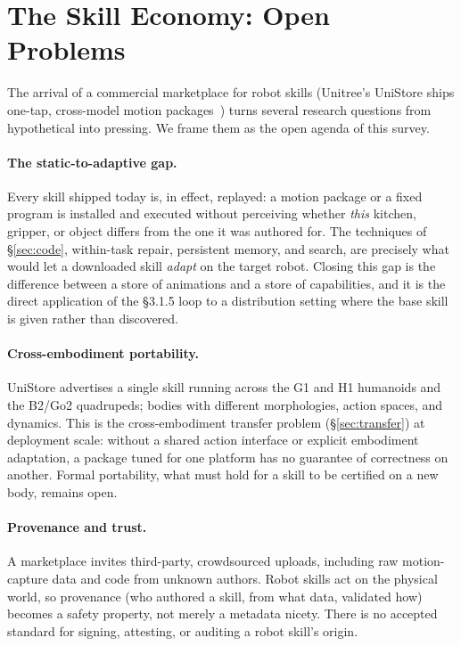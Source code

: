\section{The Skill Economy: Open Problems}
\label{sec:open}

The arrival of a commercial marketplace for robot skills (Unitree's UniStore ships
one-tap, cross-model motion packages~\citep{unistore2026}) turns several research
questions from hypothetical into pressing. We frame them as the open agenda of this survey.

\paragraph{The static-to-adaptive gap.}
Every skill shipped today is, in effect, replayed: a motion package or a fixed program is
installed and executed without perceiving whether \emph{this} kitchen, gripper, or object
differs from the one it was authored for. The techniques of \S\ref{sec:code}, within-task
repair, persistent memory, and search, are precisely what would let a downloaded skill
\emph{adapt} on the target robot. Closing this gap is the difference between a store of
animations and a store of capabilities, and it is the direct application of the \S3.1.5
loop to a distribution setting where the base skill is given rather than discovered.

\paragraph{Cross-embodiment portability.}
UniStore advertises a single skill running across the G1 and H1 humanoids and the B2/Go2
quadrupeds; bodies with different morphologies, action spaces, and dynamics. This is the
cross-embodiment transfer problem (\S\ref{sec:transfer}) at deployment scale: without a
shared action interface \citep{openx} or explicit embodiment adaptation, a package tuned
for one platform has no guarantee of correctness on another. Formal portability, what must
hold for a skill to be certified on a new body, remains open.

\paragraph{Provenance and trust.}
A marketplace invites third-party, crowdsourced uploads, including raw motion-capture data
and code from unknown authors. Robot skills act on the physical world, so provenance
(who authored a skill, from what data, validated how) becomes a safety property, not merely
a metadata nicety. There is no accepted standard for signing, attesting, or auditing a
robot skill's origin.

